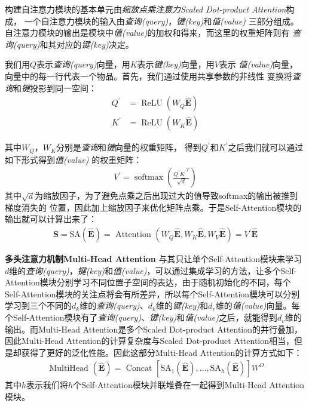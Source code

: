 构建自注意力模块的基本单元由\textit{缩放点乘注意力Scaled Dot-product Attention}构成，%
一个自注意力模块的输入由\textit{查询(query)}，\textit{键(key)}和\textit{值(value)}%
三部分组成。自注意力模块的输出是模块中\textit{值(value)}的加权和得来，而这里的权重矩阵则有%
\textit{查询(query)}和其对应的\textit{键(key)}决定。

我们用$Q$表示\textit{查询(query)}向量，用$K$表示\textit{键(key)}向量，用$V$表示%
\textit{值(value)}向量，向量中的每一行代表一个物品。首先，我们通过使用共享参数的非线性%
变换将\textit{查询}和\textit{键}投影到同一空间：
\begin{align} 
	Q^{\prime} &=\operatorname{ReLU}(W_{Q}\widehat{\mathbf{E}}) \\ 
	K^{\prime} &=\operatorname{ReLU}(W_{K}\widehat{\mathbf{E}})
\end{align}

其中$W_{Q}$，$W_{K}$分别是\textit{查询}和\textit{键}向量的权重矩阵，%
得到$Q^{\prime}$和$K^{\prime}$之后我们就可以通过如下形式得到\textit{值(value)}%
的权重矩阵：
\begin{align} 
	V^{\prime}=\operatorname{softmax}(\frac{Q^{\prime} {K^{\prime}}^{T}}{\sqrt{d}})
\end{align}
其中$\sqrt{d}$为缩放因子，为了避免点乘之后出现过大的值导致softmax的输出被推到梯度消失的%
位置，因此加上缩放因子来优化矩阵点乘。于是Self-Attention模块的输出就可以计算出来了：
\begin{align} 
	\mathbf{S}=\mathrm{SA}(\widehat{\mathbf{E}})=\text { Attention }(W_{Q}\widehat{\mathbf{E}}, W_{K}\widehat{\mathbf{E}}, W_{V}\widehat{\mathbf{E}}) = V^{\prime}\widehat{\mathbf{E}}
\end{align}

\textbf{多头注意力机制Multi-Head Attention}
{}
与其只让单个Self-Attention模块来学习$d$维的\textit{查询(query)}，\textit{键(key)}和\textit{值(value)}，可以通过集成学习的方法，让多个Self-Attention模块分别学习不同位置子空间的表达，由于随机初始化的不同，每个Self-Attention模块的关注点将会有所差异，所以每个Self-Attention模块可以分别学习到三个不同的$d_{k}$维的\textit{查询(query)}、$d_{k}$维的\textit{键(key)}和$d_{v}$维的\textit{值(value)}向量。每个Self-Attention模块有了\textit{查询(query)}、\textit{键(key)}和\textit{值(value)}之后，就能得到$d_{v}$维的输出。而Multi-Head Attention是多个Scaled Dot-product Attention的并行叠加，因此Multi-Head Attention的计算复杂度与Scaled Dot-product Attention相当，但是却获得了更好的泛化性能。因此这部分Multi-Head Attention的计算方式如下：
\begin{align} 
	\text { MultiHead }(\widehat{\mathbf{E}}) =\text { Concat }[\mathrm{SA}_{1}(\widehat{\mathbf{E}}), \ldots, \mathrm{SA}_{h}(\widehat{\mathbf{E}})] W^{O}
\end{align}
其中$h$表示我们将$h$个Self-Attention模块并联堆叠在一起得到Multi-Head Attention模块。


